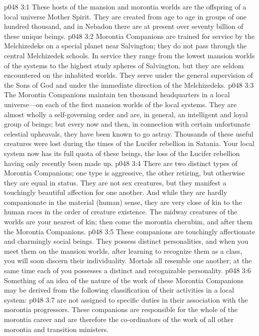 \vs p048 3:1 These hosts of the mansion and morontia worlds are the offspring of a local universe Mother Spirit. They are created from age to age in groups of one hundred thousand, and in Nebadon there are at present over seventy billion of these unique beings.\plusone
\vs p048 3:2 Morontia Companions are trained for service by the Melchizedeks on a special planet near Salvington; they do not pass through the central Melchizedek schools. In service they range from the lowest mansion worlds of the systems to the highest study spheres of Salvington, but they are seldom encountered on the inhabited worlds. They serve under the general supervision of the Sons of God and under the immediate direction of the Melchizedeks.
\vs p048 3:3 The Morontia Companions maintain ten thousand headquarters in a local universe---on each of the first mansion worlds of the local systems. They are almost wholly a self\hyp{}governing order and are, in general, an intelligent and loyal group of beings; but every now and then, in connection with certain unfortunate celestial upheavals, they have been known to go astray. Thousands of these useful creatures were lost during the times of the Lucifer rebellion in Satania. Your local system now has its full quota of these beings, the loss of the Lucifer rebellion having only recently been made up.
\pc \vs p048 3:4 There are two distinct types of Morontia Companions; one type is aggressive, the other retiring, but otherwise they are equal in status. They are not sex creatures, but they manifest a touchingly beautiful affection for one another. And while they are hardly companionate in the material (human) sense, they are very close of kin to the human races in the order of creature existence. The midway creatures of the worlds are your nearest of kin; then come the morontia cherubim, and after them the Morontia Companions.
\vs p048 3:5 These companions are touchingly affectionate and charmingly social beings. They possess distinct personalities, and when you meet them on the mansion worlds, after learning to recognize them as a class, you will soon discern their individuality. Mortals all resemble one another; at the same time each of you possesses a distinct and recognizable personality.
\pc \vs p048 3:6 Something of an idea of the nature of the work of these Morontia Companions may be derived from the following classification of their activities in a local system:
\pc \vs p048 3:7 \bibnobreakspace {} are not assigned to specific duties in their association with the morontia progressors. These companions are responsible for the whole of the morontia career and are therefore the co\hyp{}ordinators of the work of all other morontia and transition ministers.
